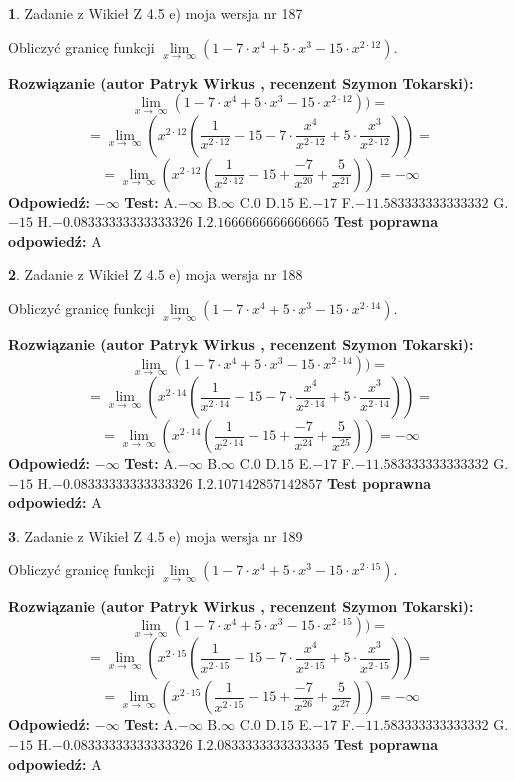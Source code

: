 \documentclass[12pt, a4paper]{article}
\theoremstyle{definition} %
\newtheorem{zad}{}
\newcommand{\zadStart}[1]{\begin{zad}#1\newline}
\newcommand{\zadStop}{\end{zad}}
\newcommand{\rozwStart}[2]{\noindent \textbf{Rozwiązanie (autor #1 , recenzent #2): }\newline}
\newcommand{\rozwStop}{\newline}
\newcommand{\odpStart}{\noindent \textbf{Odpowiedź:}\newline}
\newcommand{\odpStop}{\newline}
\newcommand{\testStart}{\noindent \textbf{Test:}\newline}
\newcommand{\testStop}{\newline}
\newcommand{\kluczStart}{\noindent \textbf{Test poprawna odpowiedź:}\newline}
\newcommand{\kluczStop}{\newline}
\begin{document}
\zadStart{Zadanie z Wikieł Z 4.5 e) moja wersja nr 187}


Obliczyć granicę funkcji  $\lim\limits_{x\to\ \infty}(1 - 7 \cdot x^{4}+5 \cdot x^{3}- 15 \cdot x^{2\cdot12})$.
\zadStop
\rozwStart{Patryk Wirkus}{Szymon Tokarski}
$$\lim\limits_{x\to\ \infty}(1 - 7 \cdot x^{4}+5 \cdot x^{3}- 15 \cdot x^{2\cdot12}))=$$
$$=\lim\limits_{x\to\ \infty}(x^{2\cdot12}(\frac{1}{x^{2\cdot12}}-15 -7 \cdot \frac{x^{4}}{x^{2\cdot12}}+5 \cdot \frac{x^{3}}{x^{2\cdot12}}))=$$
$$=\lim\limits_{x\to\ \infty}(x^{2\cdot12}(\frac{1}{x^{2\cdot12}}-15 + \frac{-7}{x^{20}}+ \frac{5}{x^{21}}))=-\infty$$
\rozwStop
\odpStart
$-\infty$
\odpStop
\testStart
A.$-\infty$ B.$\infty$ C.$0$ D.$15$ E.$-17$
F.$-11.583333333333332$ G.$-15$
H.$-0.08333333333333326$
I.$2.1666666666666665$
\testStop
\kluczStart
A
\kluczStop



\zadStart{Zadanie z Wikieł Z 4.5 e) moja wersja nr 188}


Obliczyć granicę funkcji  $\lim\limits_{x\to\ \infty}(1 - 7 \cdot x^{4}+5 \cdot x^{3}- 15 \cdot x^{2\cdot14})$.
\zadStop
\rozwStart{Patryk Wirkus}{Szymon Tokarski}
$$\lim\limits_{x\to\ \infty}(1 - 7 \cdot x^{4}+5 \cdot x^{3}- 15 \cdot x^{2\cdot14}))=$$
$$=\lim\limits_{x\to\ \infty}(x^{2\cdot14}(\frac{1}{x^{2\cdot14}}-15 -7 \cdot \frac{x^{4}}{x^{2\cdot14}}+5 \cdot \frac{x^{3}}{x^{2\cdot14}}))=$$
$$=\lim\limits_{x\to\ \infty}(x^{2\cdot14}(\frac{1}{x^{2\cdot14}}-15 + \frac{-7}{x^{24}}+ \frac{5}{x^{25}}))=-\infty$$
\rozwStop
\odpStart
$-\infty$
\odpStop
\testStart
A.$-\infty$ B.$\infty$ C.$0$ D.$15$ E.$-17$
F.$-11.583333333333332$ G.$-15$
H.$-0.08333333333333326$
I.$2.107142857142857$
\testStop
\kluczStart
A
\kluczStop



\zadStart{Zadanie z Wikieł Z 4.5 e) moja wersja nr 189}


Obliczyć granicę funkcji  $\lim\limits_{x\to\ \infty}(1 - 7 \cdot x^{4}+5 \cdot x^{3}- 15 \cdot x^{2\cdot15})$.
\zadStop
\rozwStart{Patryk Wirkus}{Szymon Tokarski}
$$\lim\limits_{x\to\ \infty}(1 - 7 \cdot x^{4}+5 \cdot x^{3}- 15 \cdot x^{2\cdot15}))=$$
$$=\lim\limits_{x\to\ \infty}(x^{2\cdot15}(\frac{1}{x^{2\cdot15}}-15 -7 \cdot \frac{x^{4}}{x^{2\cdot15}}+5 \cdot \frac{x^{3}}{x^{2\cdot15}}))=$$
$$=\lim\limits_{x\to\ \infty}(x^{2\cdot15}(\frac{1}{x^{2\cdot15}}-15 + \frac{-7}{x^{26}}+ \frac{5}{x^{27}}))=-\infty$$
\rozwStop
\odpStart
$-\infty$
\odpStop
\testStart
A.$-\infty$ B.$\infty$ C.$0$ D.$15$ E.$-17$
F.$-11.583333333333332$ G.$-15$
H.$-0.08333333333333326$
I.$2.0833333333333335$
\testStop
\kluczStart
A
\kluczStop
\end{document}
